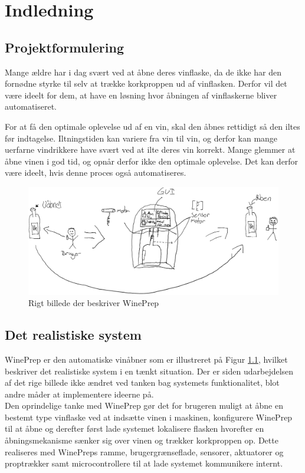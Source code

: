 \chapter{Indledning}
\section{Projektformulering}
Mange ældre har i dag svært ved at åbne deres vinflaske, da de ikke har den fornødne styrke til selv at trække korkproppen ud af vinflasken. Derfor vil det være ideelt for dem, at have en løsning hvor åbningen af vinflaskerne bliver automatiseret.

For at få den optimale oplevelse ud af en vin, skal den åbnes rettidigt så den iltes før indtagelse. Iltningstiden kan variere fra vin til vin, og derfor kan mange uerfarne vindrikkere have svært ved at ilte deres vin korrekt. Mange glemmer at åbne vinen i god tid, og opnår derfor ikke den optimale oplevelse. Det kan derfor være ideelt, hvis denne proces også automatiseres.

\begin{figure}[H]
	\caption{Rigt billede der beskriver WinePrep}
	\label{RIGTBILLEDE}
	\includegraphics[scale=0.6]{WinePrep_realistisk.png}
\end{figure}

\section{Det realistiske system}
WinePrep er den automatiske vinåbner som er illustreret på Figur \ref{RIGTBILLEDE}, hvilket beskriver det realistiske system i en tænkt situation. Der er siden udarbejdelsen af det rige billede ikke ændret ved tanken bag systemets funktionalitet, blot andre måder at implementere ideerne på.\\

Den oprindelige tanke med WinePrep gør det for brugeren muligt at åbne en bestemt type vinflaske ved at indsætte vinen i maskinen, konfigurere WinePrep til at åbne og derefter først lade systemet lokalisere flasken hvorefter en åbningsmekanisme sænker sig over vinen og trækker korkproppen op. Dette realiseres med WinePreps ramme, brugergrænseflade, sensorer, aktuatorer og proptrækker samt microcontrollere til at lade systemet kommunikere internt.

